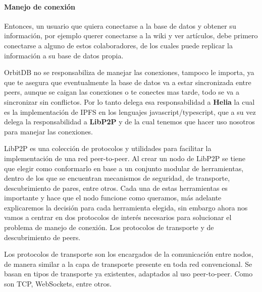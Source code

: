 \paragraph{Manejo de conexión}

Entonces, un usuario que quiera conectarse a la base de datos y obtener su información, por ejemplo querer conectarse a la wiki y ver artículos, debe primero conectarse a alguno de estos colaboradores, de los cuales puede replicar la información a su base de datos propia.

OrbitDB no se responsabiliza de manejar las conexiones, tampoco le importa, ya que te asegura que eventualmente la base de datos va a estar sincronizada entre peers, aunque se caigan las conexiones o te conectes mas tarde, todo se va a sincronizar sin conflictos. Por lo tanto delega esa responsabilidad a \textbf{Helia}\cite{helia} la cual es la implementación de IPFS en los lenguajes javascript/typescript, que a su vez delega la responsabilidad a \textbf{LibP2P}\cite{libp2p} y de la cual tenemos que hacer uso nosotros para manejar las conexiones.

LibP2P es una colección de protocolos y utilidades para facilitar la implementación de una red peer-to-peer. 
Al crear un nodo de LibP2P se tiene que elegir como conformarlo en base a un conjunto modular de herramientas,
dentro de los que se encuentran mecanismos de seguridad, de transporte, descubrimiento de pares, entre otros. Cada una de estas herramientas es importante y hace que el nodo funcione como queramos, más adelante explicaremos la decisión para cada herramienta elegida, sin embargo ahora nos vamos a centrar en dos protocolos de interés necesarios para solucionar el problema de manejo de conexión. Los protocolos de transporte y de descubrimiento de peers.

Los protocolos de transporte son los encargados de la comunicación entre nodos, de manera similar a la capa de transporte presente en toda red convencional. Se basan en tipos de transporte ya existentes, adaptados al uso peer-to-peer. Como son TCP, WebSockets, entre otros.








